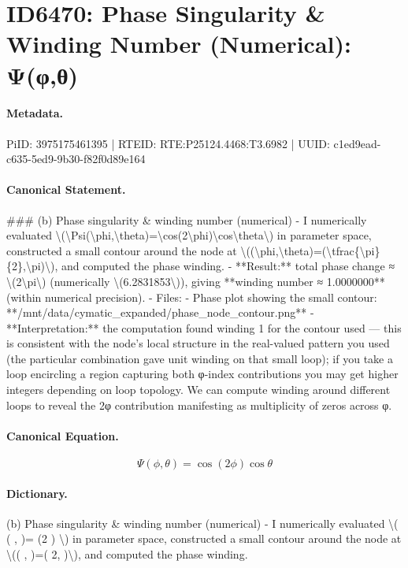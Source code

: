 \section*{ID6470: Phase Singularity \& Winding Number (Numerical): Ψ(φ,θ)}
\paragraph{Metadata.}
PiID: 3975175461395 | RTEID: RTE:P25124.4468:T3.6982 | UUID: c1ed9ead-c635-5ed9-9b30-f82f0d89e164

\paragraph{Canonical Statement.}
\#\#\# (b) Phase singularity \& winding number (numerical) - I numerically evaluated \textbackslash{}(\textbackslash{}Psi(\textbackslash{}phi,\textbackslash{}theta)=\textbackslash{}cos(2\textbackslash{}phi)\textbackslash{}cos\textbackslash{}theta\textbackslash{}) in parameter space, constructed a small contour around the node at \textbackslash{}((\textbackslash{}phi,\textbackslash{}theta)=(\textbackslash{}tfrac\{\textbackslash{}pi\}\{2\},\textbackslash{}pi)\textbackslash{}), and computed the phase winding. - **Result:** total phase change ≈ \textbackslash{}(2\textbackslash{}pi\textbackslash{}) (numerically \textbackslash{}(6.2831853\textbackslash{})), giving **winding number ≈ 1.0000000** (within numerical precision). - Files: - Phase plot showing the small contour: **/mnt/data/cymatic\_expanded/phase\_node\_contour.png** - **Interpretation:** the computation found winding 1 for the contour used — this is consistent with the node’s local structure in the real-valued pattern you used (the particular combination gave unit winding on that small loop); if you take a loop encircling a region capturing both φ-index contributions you may get higher integers depending on loop topology. We can compute winding around different loops to reveal the 2φ contribution manifesting as multiplicity of zeros across φ.

\paragraph{Canonical Equation.}
\[
\Psi(\phi,\theta)=\cos(2\phi)\cos\theta
\]

\paragraph{Dictionary.}
(b) Phase singularity \& winding number (numerical) - I numerically evaluated \textbackslash{}( ( , )= (2 ) \textbackslash{}) in parameter space, constructed a small contour around the node at \textbackslash{}(( , )=( 2, )\textbackslash{}), and computed the phase winding.


